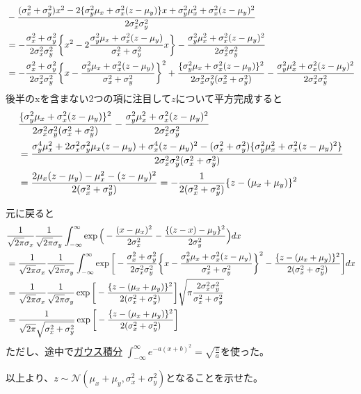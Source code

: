 \documentclass[aspectratio=169,unicode,dvipdfmx,14pt]{beamer}
\begin{document}
\begin{frame}
\FontMath
\begin{align}
& -\frac{(\sigma_x^2+\sigma_y^2)x^2-2\{\sigma_y^2\mu_x+\sigma_x^2(z-\mu_y)\}x
+\sigma_y^2\mu_x^2+\sigma_x^2(z-\mu_y)^2}
{2\sigma_x^2\sigma_y^2}
\notag \\ & =
-\frac{\sigma_x^2+\sigma_y^2}{2\sigma_x^2\sigma_y^2}\bigg\{
x^2
-2\frac{\sigma_y^2\mu_x+\sigma_x^2(z-\mu_y)}{\sigma_x^2+\sigma_y^2}x\bigg\}
-\frac{\sigma_y^2\mu_x^2+\sigma_x^2(z-\mu_y)^2}{2\sigma_x^2\sigma_y^2}
\notag \\ & =
-\frac{\sigma_x^2+\sigma_y^2}{2\sigma_x^2\sigma_y^2}\bigg\{
x - \frac{\sigma_y^2\mu_x+\sigma_x^2(z-\mu_y)}{\sigma_x^2+\sigma_y^2}\bigg\}^2
+ \frac{ \{ \sigma_y^2\mu_x+\sigma_x^2(z-\mu_y) \}^2 }{2\sigma_x^2\sigma_y^2(\sigma_x^2+\sigma_y^2)}
-\frac{\sigma_y^2\mu_x^2+\sigma_x^2(z-\mu_y)^2}{2\sigma_x^2\sigma_y^2}
\end{align}
後半のxを含まない2つの項に注目して$z$について平方完成すると
\begin{align}
&\frac{ \{ \sigma_y^2\mu_x+\sigma_x^2(z-\mu_y) \}^2 }{2\sigma_x^2\sigma_y^2(\sigma_x^2+\sigma_y^2)}
-\frac{\sigma_y^2\mu_x^2+\sigma_x^2(z-\mu_y)^2}{2\sigma_x^2\sigma_y^2}
\notag \\ & =
\frac{ \sigma_y^4\mu_x^2 + 2 \sigma_x^2\sigma_y^2\mu_x(z-\mu_y) + \sigma_x^4(z-\mu_y)^2
- (\sigma_x^2+\sigma_y^2) \{ \sigma_y^2\mu_x^2+\sigma_x^2(z-\mu_y)^2 \} }
{2\sigma_x^2\sigma_y^2(\sigma_x^2+\sigma_y^2)}
\notag \\ & =
\frac{ 2\mu_x(z-\mu_y) - \mu_x^2 - (z-\mu_y)^2 }{2(\sigma_x^2+\sigma_y^2)}
= -\frac{1}{2(\sigma_x^2+\sigma_y^2)} \{ z - (\mu_x + \mu_y) \}^2
\end{align}
\end{frame}

\begin{frame}
\FontMath
元に戻ると
\begin{align}
& \frac{1}{\sqrt{2\pi}\sigma_x}
\frac{1}{\sqrt{2\pi}\sigma_y}
\int_{-\infty}^{\infty}
\exp\Big(-\frac{(x-\mu_x)^2}{2\sigma_x^2}
-\frac{\{(z-x)-\mu_y\}^2}{2\sigma_y^2}\Big)dx
\notag \\ & =
\frac{1}{\sqrt{2\pi}\sigma_x}
\frac{1}{\sqrt{2\pi}\sigma_y}
\int_{-\infty}^{\infty}
\exp\bigg[
-\frac{\sigma_x^2+\sigma_y^2}{2\sigma_x^2\sigma_y^2}\bigg\{
x - \frac{\sigma_y^2\mu_x+\sigma_x^2(z-\mu_y)}{\sigma_x^2+\sigma_y^2}\bigg\}^2
-\frac{\{ z - (\mu_x + \mu_y) \}^2}{2(\sigma_x^2+\sigma_y^2)}
\bigg]dx
\notag \\ & =
\frac{1}{\sqrt{2\pi}\sigma_x}
\frac{1}{\sqrt{2\pi}\sigma_y}
\exp\bigg[
-\frac{\{ z - (\mu_x + \mu_y) \}^2}{2(\sigma_x^2+\sigma_y^2)}
\bigg]
\sqrt{ \pi \frac{2\sigma_x^2\sigma_y^2}{\sigma_x^2+\sigma_y^2} }
\notag \\ & =
\frac{1}{\sqrt{2\pi} \sqrt{\sigma_x^2+\sigma_y^2} }
\exp\bigg[
-\frac{\{ z - (\mu_x + \mu_y) \}^2}{2(\sigma_x^2+\sigma_y^2)}
\bigg]
\end{align}
ただし、途中で\href{https://en.wikipedia.org/wiki/Gaussian_integral}{ガウス積分}
$\int_{-\infty}^\infty e^{-a(x+b)^2} = \sqrt{\frac{\pi}{a}}$を使った。

以上より、$z\sim\mathcal{N}(\mu_x + \mu_y, \sigma_x^2+\sigma_y^2)$となることを示せた。
\end{frame}
\end{document}
